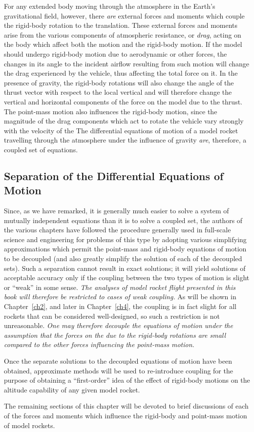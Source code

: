 For any extended body moving through the atmosphere in the Earth's gravitational field, however, there \emph{are} external forces and moments which couple the rigid-body rotation to the \CG{} translation. These external forces and moments arise from the various components of atmospheric resistance, or \emph{drag}, acting on the body which affect both the \CG{} motion and the rigid-body motion. If the model should undergo rigid-body motion due to aerodynamic or other forces, the changes in its angle to the incident airflow resulting from such motion will change the drag experienced by the vehicle, thus affecting the total force on it. In the presence of gravity, the rigid-body rotations will also change the angle of the thrust vector with respect to the local vertical and will therefore change the vertical and horizontal components of the force on the model due to the thrust. The point-mass motion also influences the rigid-body motion, since the magnitude of the drag components which act to rotate the vehicle vary strongly with the velocity of the \CG{} The differential equations of motion of a model rocket travelling through the atmosphere under the influence of gravity \emph{are}, therefore, a coupled set of equations.

\subsection{Separation of the Differential Equations of Motion}\label{ch1:sec:1.2}

Since, as we have remarked, it is generally much easier to solve a system of mutually independent equations than it is to solve a coupled set, the authors of the various chapters have followed the procedure generally used in full-scale science and engineering for problems of this type by adopting various simplifying approximations which permit the point-mass and rigid-body equations of motion to be decoupled (and also greatly simplify the solution of each of the decoupled sets). Such a separation cannot result in exact solutions; it will yield solutions of acceptable accuracy only if the coupling between the two types of motion is slight or ``weak'' in some sense. \emph{The analyses of model rocket flight presented in this book will therefore be restricted to cases of weak coupling.} As will be shown in Chapter~\ref{ch2}, and later in Chapter~\ref{ch4}, the coupling is in fact slight for all rockets that can be considered well-designed, so such a restriction is not unreasonable. \emph{One may therefore decouple the equations of motion under the assumption that the forces on the \CG{} due to the rigid-body rotations are small compared to the other forces influencing the point-mass motion.}

Once the separate solutions to the decoupled equations of motion have been obtained, approximate methods will be used to re-introduce coupling for the purpose of obtaining a ``first-order'' idea of the effect of rigid-body motions on the altitude capability of any given model rocket.

The remaining sections of this chapter will be devoted to brief discussions of each of the forces and moments which influence the rigid-body and point-mass motion of model rockets.
